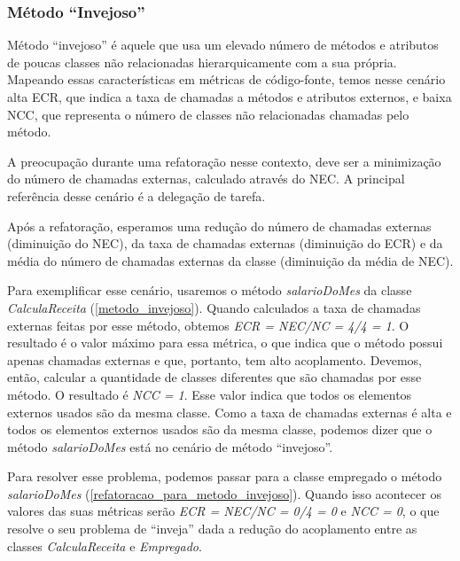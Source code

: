\subsubsection{Método ``Invejoso''}
	
	Método ``invejoso'' é aquele que usa um elevado número de métodos e atributos de poucas classes não relacionadas hierarquicamente com a sua própria. Mapeando essas características em métricas de código-fonte, temos nesse cenário alta ECR, que indica a taxa de chamadas a métodos e atributos externos, e baixa NCC, que representa o número de classes não relacionadas chamadas pelo método.
	
	A preocupação durante uma refatoração nesse contexto, deve ser a minimização do número de chamadas externas, calculado através do NEC. A principal referência desse cenário é a delegação de tarefa.
	
	Após a refatoração, esperamos uma redução do número de chamadas externas (diminuição do NEC), da taxa de chamadas externas (diminuição do ECR) e da média do número de chamadas externas da classe (diminuição da média de NEC).
                      
	Para exemplificar esse cenário, usaremos o método \textit{salarioDoMes} da classe \textit{CalculaReceita} (\ref{metodo_invejoso}). Quando calculados a taxa de chamadas externas feitas por esse método, obtemos \textit{ECR = NEC/NC = 4/4 = 1}. O resultado é o valor máximo para essa métrica, o que indica que o método possui apenas chamadas externas e que, portanto, tem alto acoplamento. Devemos, então, calcular a quantidade de classes diferentes que são chamadas por esse método. O resultado é \textit{NCC = 1}. Esse valor indica que todos os elementos externos usados são da mesma classe. Como a taxa de chamadas externas é alta e todos os elementos externos usados são da mesma classe, podemos dizer que o método \textit{salarioDoMes} está no cenário de método ``invejoso''.

	                                      

	Para resolver esse problema, podemos passar para a classe empregado o método \textit{salarioDoMes} (\ref{refatoracao_para_metodo_invejoso}). Quando isso acontecer os valores das suas métricas serão \textit{ECR = NEC/NC = 0/4 = 0} e \textit{NCC = 0}, o que resolve o seu problema de ``inveja'' dada a redução do acoplamento entre as classes \textit{CalculaReceita} e \textit{Empregado}. 

